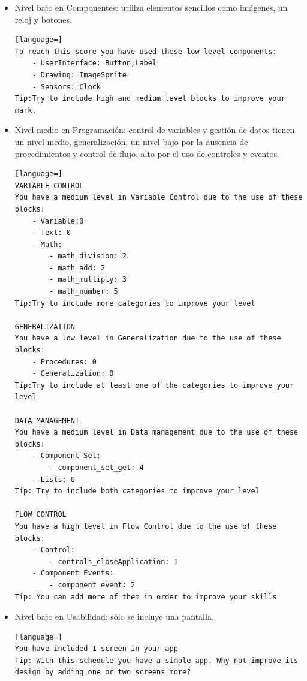 \documentclass[a4paper, 12pt]{book}
\begin{document}
\begin{itemize}
  \item Nivel bajo en Componentes: utiliza elementos sencillos como imágenes, un reloj y botones. 
\begin{lstlisting}[language=]
To reach this score you have used these low level components:
    - UserInterface: Button,Label
    - Drawing: ImageSprite
    - Sensors: Clock
Tip:Try to include high and medium level blocks to improve your mark.
\end{lstlisting}
  \item Nivel medio en Programación: control de variables y gestión de datos tienen un nivel medio, generalización, un nivel bajo por la ausencia de procedimientos y control de flujo, alto por el uso de controles y eventos. 
\begin{lstlisting}[language=]
VARIABLE CONTROL 
You have a medium level in Variable Control due to the use of these blocks:
    - Variable:0
    - Text: 0
    - Math:
        - math_division: 2
        - math_add: 2
        - math_multiply: 3
        - math_number: 5
Tip:Try to include more categories to improve your level 

GENERALIZATION
You have a low level in Generalization due to the use of these blocks:
    - Procedures: 0
    - Generalization: 0
Tip:Try to include at least one of the categories to improve your level 

DATA MANAGEMENT
You have a medium level in Data management due to the use of these blocks:
    - Component Set:
        - component_set_get: 4
    - Lists: 0
Tip: Try to include both categories to improve your level

FLOW CONTROL
You have a high level in Flow Control due to the use of these blocks:
    - Control:
        - controls_closeApplication: 1
    - Component_Events:
        - component_event: 2
Tip: You can add more of them in order to improve your skills  
\end{lstlisting}
  \item Nivel bajo en Usabilidad: sólo se incluye una pantalla. 
\begin{lstlisting}[language=]
You have included 1 screen in your app
Tip: With this schedule you have a simple app. Why not improve its design by adding one or two screens more? 
\end{lstlisting}
\end{itemize}

\end{document}
